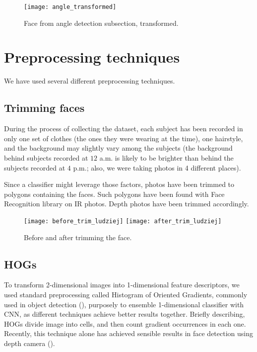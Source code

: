         \begin{figure}[H]
        \caption{Face from angle detection subsection, transformed.}
        \centering
        \texttt{[image: angle\_transformed]}
        \end{figure}

    \section{Preprocessing techniques}
    We have used several different preprocessing techniques.
        \subsection*{Trimming faces}
        \label{sec:trimming}
        During the process of collecting the dataset, each subject has been
        recorded in only one set of clothes (the ones they were wearing at the
        time), one hairstyle, and the background may slightly vary among the
        subjects (the background behind subjects recorded at $12$ a.m. is
        likely to be brighter than behind the subjects recorded at $4$ p.m.;
        also, we were taking photos in 4 different places).

        Since a classifier might leverage those factors, photos have been
        trimmed to polygons containing the faces. Such polygons have been
        found with Face Recognition library \cite{facerecog} on IR photos.
        Depth photos have been trimmed accordingly.

        \begin{figure}[H]
        \caption{Before and after trimming the face.}
        \centering
        \texttt{[image: before\_trim\_ludziej]}
        \texttt{[image: after\_trim\_ludziej]}
        \end{figure}

        \subsection*{HOGs}
        To transform 2-dimensional images into 1-dimensional feature descriptors,
        we used standard preprocessing called Histogram of Oriented Gradients, commonly used in
        object detection (\citeauthor{hog}), purposely to ensemble 1-dimensional classifier with CNN,
        as different techniques achieve better results together. Briefly describing,
        HOGs divide image into cells, and then count gradient occurrences in each one.
        Recently, this technique alone has achieved sensible results in face detection using depth camera (\citeauthor{rgbdhog}).

